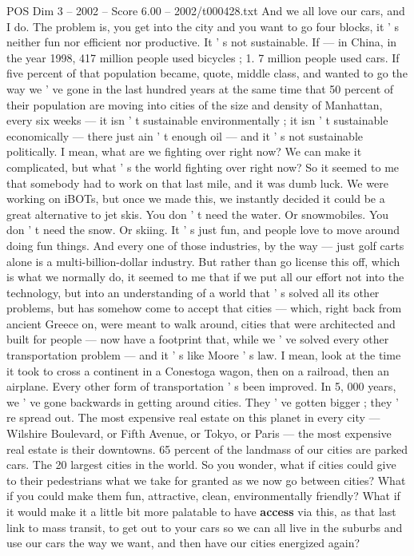 \begin{textsample}{POS Dim 3 – 2002 – Score 6.00 – 2002/t000428.txt}
And we all love our cars, and I do.
The problem is, you get into the city and you want to go four blocks, it ' s neither fun nor efficient nor productive.
It ' s not sustainable.
If — in China, in the year 1998, 417 million people used bicycles ; 1. 7 million people used cars.
If five percent of that population became, quote, middle class, and wanted to go the way we ' ve gone in the last hundred years at the same time that 50 percent of their population are moving into cities of the size and density of Manhattan, every six weeks — it isn ' t sustainable environmentally ; it isn ' t sustainable economically — there just ain ' t enough oil — and it ' s not sustainable politically.
I mean, what are we fighting over right now?
We can make it complicated, but what ' s the world fighting over right now?
So it seemed to me that somebody had to work on that last mile, and it was dumb luck.
We were working on iBOTs, but once we made this, we instantly decided it could be a great alternative to jet skis.
You don ' t need the water.
Or snowmobiles.
You don ' t need the snow.
Or skiing.
It ' s just fun, and people love to move around doing fun things.
And every one of those industries, by the way — just golf carts alone is a multi-billion-dollar industry.
But rather than go license this off, which is what we normally do, it seemed to me that if we put all our effort not into the technology, but into an understanding of a world that ' s solved all its other problems, but has somehow come to accept that cities — which, right back from ancient Greece on, were meant to walk around, cities that were architected and built for people — now have a footprint that, while we ' ve solved every other transportation problem — and it ' s like Moore ' s law.
I mean, look at the time it took to cross a continent in a Conestoga wagon, then on a railroad, then an airplane.
Every other form of transportation ' s been improved.
In 5, 000 years, we ' ve gone backwards in getting around cities.
They ' ve gotten bigger ; they ' re spread out.
The most expensive real estate on this planet in every city — Wilshire Boulevard, or Fifth Avenue, or Tokyo, or Paris — the most expensive real estate is their downtowns. 65 percent of the landmass of our cities are parked cars.
The 20 largest cities in the world.
So you wonder, what if cities could give to their pedestrians what we take for granted as we now go between cities?
What if you could make them fun, attractive, clean, environmentally friendly?
What if it would make it a little bit more palatable to have \textbf{access} via this, as that last link to mass transit, to get out to your cars so we can all live in the suburbs and use our cars the way we want, and then have our cities energized again?

\end{textsample}
